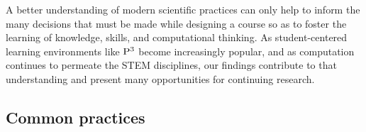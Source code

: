 \documentclass{msuphddissertation}
\begin{document}
\begin{doublespace}
A better understanding of modern scientific practices can only help to inform the many decisions that must be made while designing a course so as to foster the learning of knowledge, skills, and computational thinking.  As student-centered learning environments like ${\rm P}^{3}$ become increasingly popular, and as computation continues to permeate the STEM disciplines, our findings contribute to that understanding and present many opportunities for continuing research.



\begin{appendices}

\chapter{Common practices}\label{app:common}


\end{appendices}
\end{doublespace}
\end{document}
